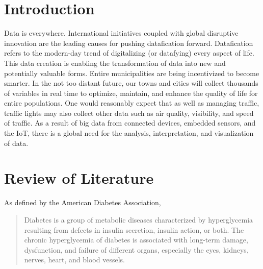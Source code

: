 \documentclass[12pt]{article}
\begin{document}
\newpage
\part{Introduction}
Data is everywhere. International initiatives coupled with global disruptive innovation are the leading causes for pushing datafication forward. Datafication refers to the modern-day trend of digitalizing (or datafying) every aspect of life. This data creation is enabling the transformation of data into new and potentially valuable forms. Entire municipalities are being incentivized to become smarter. In the not too distant future, our towns and cities will collect thousands of variables in real time to optimize, maintain, and enhance the quality of life for entire populations. One would reasonably expect that as well as managing traffic, traffic lights may also collect other data such as air quality, visibility, and speed of traffic. As a result of big data from connected devices, embedded sensors, and the IoT, there is a global need for the analysis, interpretation, and visualization of data.

\newpage
\part{Review of Literature}
\iffalse
Source : https://www.ncbi.nlm.nih.gov/pmc/articles/PMC5851210/
---------------------
Source : https://www.ncbi.nlm.nih.gov/pmc/articles/PMC6000484/
---------------------
PDF :
Andreas Holzinger 1,2( B )

Holzinger Group, HCI-KDD, Institute for Medical Informatics,
Statistics and Documentation, Medical University Graz, Graz, Austria
a.holzinger@hci-kdd.org

Institute for Information Systems and Computer Media,
Graz University of Technology, Graz, Austria
---------------------
\fi
As defined by the American Diabetes Association\cite{classdiag},
\begin{quote}
Diabetes is a group of metabolic diseases characterized by hyperglycemia resulting from defects in insulin secretion, insulin action, or both. The chronic hyperglycemia of diabetes is associated with long-term damage, dysfunction, and failure of different organs, especially the eyes, kidneys, nerves, heart, and blood vessels.
\end{quote}
\end{document}
